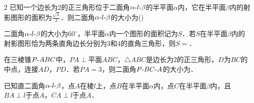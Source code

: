 \documentclass[fontset=none]{ctexart}
\begin{document}
\begin{multicols}{2}
 已知一个边长为\(2\)的正三角形位于二面角\(\alpha\text{-}\penalty100 l\text{-}\penalty100 \beta\)的半平面\(\alpha\)内，它在半平面\(\beta\)内的射影图形的面积为\(\frac{\sqrt{3}}{2}\)．则二面角\(\alpha\text{-}\penalty100 l\text{-}\penalty100 \beta\)的大小为\nobreak(\kongwei)
\begin{ansblock}[练-课时09-12]
\setlength{\anshang}{7.6mm}%
\end{ansblock}

 二面角\(\alpha\text{-}\penalty100 l\text{-}\penalty100 \beta\)的大小为\(60^\circ\)，半平面\(\alpha\)内一个图形的面积记为\(S\)．若\(S\)在半平面\(\beta\)内的射影图形恰为两条直角边长分别为\(3\)和\(4\)的直角三角形，则\(S=\)\kongbai{}．
\begin{ansblock}[练-课时09-13]
\setlength{\anshang}{7.6mm}%
\end{ansblock}

 在三棱锥\(P\text{-}\penalty100 ABC\)中，\(PA\perp\)平面\(ABC\)，\(\triangle ABC\)是边长为\(2\)的正三角形，\(D\)为\(BC\)的中点，连接\(AD\)，\(PD\)．若\(PA=3\)，则二面角\(P\text{-}\penalty100 BC\text{-}\penalty100 A\)的大小为\kongbai{}．
\begin{ansblock}[练-课时09-14]
\setlength{\anshang}{7.6mm}%
\end{ansblock}


 已知直二面角\(\alpha\text{-}\penalty100 l\text{-}\penalty100 \beta\)，点\(A\)在棱\(l\)上，点\(B\)在半平面\(\alpha\)内，点\(C\)在半平面\(\beta\)内，且\(BA\perp l\)于点\(A\)，\(CA\perp l\)于点\(A\)．
\xiexwei{70mm}
\begin{ansblock}[练-课时09-15]
\setlength{\anshang}{7.6mm}%
\end{ansblock}


\end{multicols}
\end{document}
